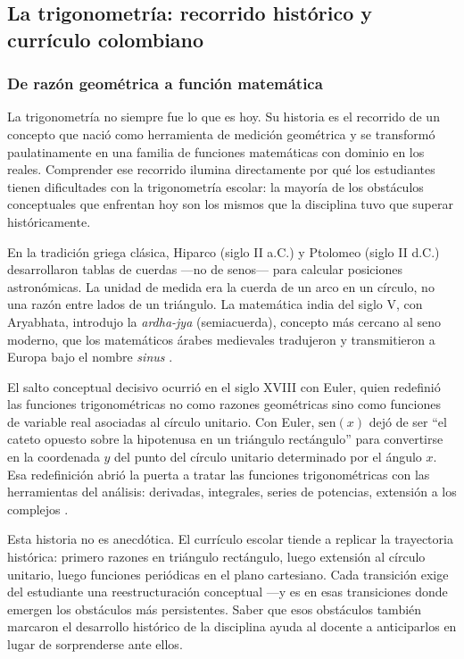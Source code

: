 \subsection{La trigonometría: recorrido histórico y currículo colombiano}

\subsubsection{De razón geométrica a función matemática}

La trigonometría no siempre fue lo que es hoy. Su historia es el recorrido de un concepto que nació como herramienta de medición geométrica y se transformó paulatinamente en una familia de funciones matemáticas con dominio en los reales. Comprender ese recorrido ilumina directamente por qué los estudiantes tienen dificultades con la trigonometría escolar: la mayoría de los obstáculos conceptuales que enfrentan hoy son los mismos que la disciplina tuvo que superar históricamente.

En la tradición griega clásica, Hiparco (siglo II a.C.) y Ptolomeo (siglo II d.C.) desarrollaron tablas de cuerdas —no de senos— para calcular posiciones astronómicas. La unidad de medida era la cuerda de un arco en un círculo, no una razón entre lados de un triángulo. La matemática india del siglo V, con Aryabhata, introdujo la \emph{ardha-jya} (semiacuerda), concepto más cercano al seno moderno, que los matemáticos árabes medievales tradujeron y transmitieron a Europa bajo el nombre \emph{sinus} \parencite[p.~311]{katzCalculusTrigonometricFunctions1987}.

El salto conceptual decisivo ocurrió en el siglo XVIII con Euler, quien redefinió las funciones trigonométricas no como razones geométricas sino como funciones de variable real asociadas al círculo unitario. Con Euler, $\mathrm{sen}(x)$ dejó de ser ``el cateto opuesto sobre la hipotenusa en un triángulo rectángulo'' para convertirse en la coordenada $y$ del punto del círculo unitario determinado por el ángulo $x$. Esa redefinición abrió la puerta a tratar las funciones trigonométricas con las herramientas del análisis: derivadas, integrales, series de potencias, extensión a los complejos \parencite{maorTrigonometricDelights1998}.

Esta historia no es anecdótica. El currículo escolar tiende a replicar la trayectoria histórica: primero razones en triángulo rectángulo, luego extensión al círculo unitario, luego funciones periódicas en el plano cartesiano. Cada transición exige del estudiante una reestructuración conceptual —y es en esas transiciones donde emergen los obstáculos más persistentes. Saber que esos obstáculos también marcaron el desarrollo histórico de la disciplina ayuda al docente a anticiparlos en lugar de sorprenderse ante ellos.

